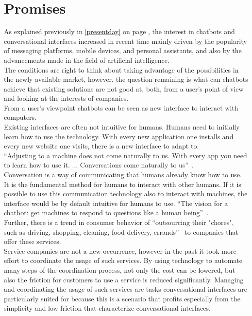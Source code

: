 \section{Promises}


As explained previously in \ref{presentday} on page \pageref{presentday}, the interest in chatbots and conversational interfaces increased in recent time mainly driven by the popularity of messaging platforms, mobile devices, and personal assistants, and also by the advancements made in the field of artificial intelligence.
\\
The conditions are right to think about taking advantage of the possibilities in the newly available market, however, the question remaining is what can chatbots achieve that existing solutions are not good at, both, from a user's point of view and looking at the interests of companies.
\\

From a user's viewpoint chatbots can be seen as new interface to interact with computers.
\\
Existing interfaces are often not intuitive for humans.
Humans need to initially learn how to use the technology.
With every new application one installs and every new website one visits, there is a new interface to adapt to.
\\
``Adjusting to a machine does not come naturally to us. With every app you need to learn how to use it. ... Conversations come naturally to us''~\cite{techinasia}.
\\
Conversation is a way of communicating that humans already know how to use.
It is the fundamental method for humans to interact with other humans.
If it is possible to use this communication technology also to interact with machines, the interface would be by default intuitive for humans to use.
``The vision for a chatbot: get machines to respond to questions like a human being''~\cite{techinasia}.
\\

Further, there is a trend in consumer behavior of ``outsourcing their "chores", such as driving, shopping, cleaning, food delivery, errands''~\cite{chatbotbook} to companies that offer these services.
\\
Service companies are not a new occurrence, however in the past it took more effort to coordinate the usage of such services.
By using technology to automate many steps of the coordination process, not only the cost can be lowered,
but also the friction for customers to use a service is reduced significantly.
Managing and coordinating the usage of such services are tasks conversational interfaces are particularly suited for because this is a scenario that profits especially from the simplicity and low friction that characterize conversational interfaces.
\\

